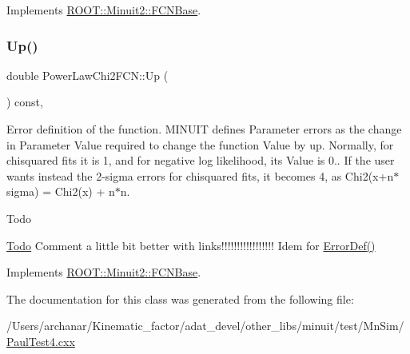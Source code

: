 Implements \mbox{\hyperlink{classROOT_1_1Minuit2_1_1FCNBase_ae4a86bd94d0d0f5ca6fc8f8ab2bb43cd}{R\+O\+O\+T\+::\+Minuit2\+::\+F\+C\+N\+Base}}.

\mbox{\label{classPowerLawChi2FCN_ad202014937fe0e66dffc0fa9061ca9df}} 
\subsubsection{\texorpdfstring{Up()}{Up()}}
{\footnotesize\ttfamily double Power\+Law\+Chi2\+F\+C\+N\+::\+Up (\begin{DoxyParamCaption}{ }\end{DoxyParamCaption}) const\hspace{0.3cm}{\ttfamily [inline]}, {\ttfamily [virtual]}}

Error definition of the function. M\+I\+N\+U\+IT defines Parameter errors as the change in Parameter Value required to change the function Value by up. Normally, for chisquared fits it is 1, and for negative log likelihood, its Value is 0.. If the user wants instead the 2-\/sigma errors for chisquared fits, it becomes 4, as Chi2(x+n$\ast$sigma) = Chi2(x) + n$\ast$n.

\begin{DoxyRefDesc}{Todo}
\item[\mbox{\hyperlink{todo__todo000001}{Todo}}]Comment a little bit better with links!!!!!!!!!!!!!!!!! Idem for \mbox{\hyperlink{classROOT_1_1Minuit2_1_1FCNBase_ac4592475c58a65b037ba97ab5f3cba10}{Error\+Def()}}\end{DoxyRefDesc}


Implements \mbox{\hyperlink{classROOT_1_1Minuit2_1_1FCNBase_a04ef08ddad92ce8d89d498efbe021c39}{R\+O\+O\+T\+::\+Minuit2\+::\+F\+C\+N\+Base}}.



The documentation for this class was generated from the following file\+:\begin{DoxyCompactItemize}
\item 
/\+Users/archanar/\+Kinematic\+\_\+factor/adat\+\_\+devel/other\+\_\+libs/minuit/test/\+Mn\+Sim/\mbox{\hyperlink{PaulTest4_8cxx}{Paul\+Test4.\+cxx}}\end{DoxyCompactItemize}
